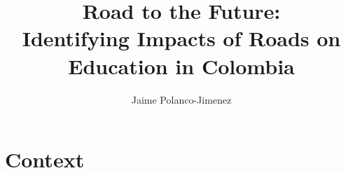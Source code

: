\documentclass[9pt]{beamer}
\title[IEA World Congress 2023]{Road to the Future: \\ Identifying Impacts of Roads on Education in Colombia}
\author[Pontificia Uni. Javeriana ] {  Jaime Polanco-Jimenez\inst{1} }
\institute[PUJ]
{\inst{1}
PhD Student -  Pontificia Universidad Javeriana \\  
 
\url{https://polanco-jaime.github.io/} \\
\date{} \\~\\
IEA World Congress 2023    
}
\begin{document}
\begin{frame}
    \maketitle
\end{frame}

 

 \section{Context }

\end{document}
